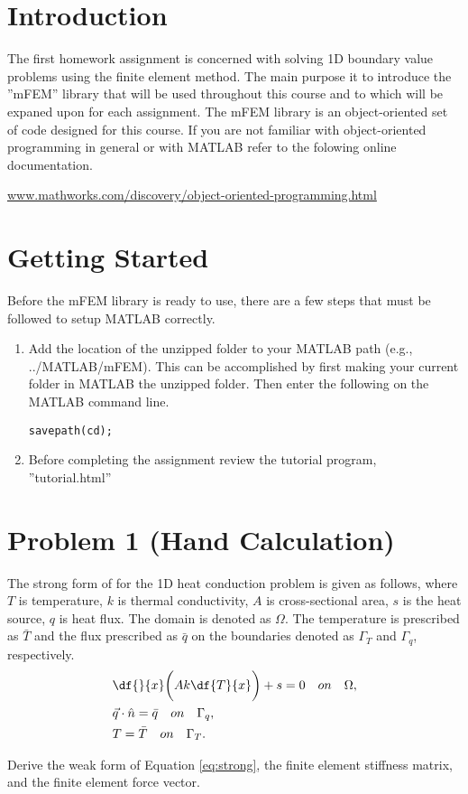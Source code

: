 \section*{Introduction}
The first homework assignment is concerned with solving 1D boundary value problems using the finite element method. The main purpose it to introduce the ''mFEM'' library that will be used throughout this course and to which will be expaned upon for each assignment. The mFEM library is an object-oriented set of code designed for this course. If you are not familiar with object-oriented programming in general or with MATLAB refer to the folowing online documentation. 
\begin{center}
\href{http://www.mathworks.com/discovery/object-oriented-programming.html}{www.mathworks.com/discovery/object-oriented-programming.html}
\end{center}

\section*{Getting Started}
Before the mFEM library is ready to use, there are a few steps that must be followed to setup MATLAB correctly.
\begin{enumerate}
\item Add the location of the unzipped folder to your MATLAB path (e.g., ../MATLAB/mFEM). This can be accomplished by first making your current folder in MATLAB the unzipped folder. Then enter the following on the MATLAB command line.
\begin{lstlisting}
savepath(cd);
\end{lstlisting} 



\item Before completing the assignment review the tutorial program, ''tutorial.html''

\end{enumerate}


\section*{Problem 1 (Hand Calculation)}
The strong form of for the 1D heat conduction problem is given as follows, where $T$ is temperature, $k$ is thermal conductivity, $A$ is cross-sectional area, $s$ is the heat source, $q$ is heat flux. The domain is denoted as $\Omega$. The temperature is prescribed as $\bar{T}$ and the flux prescribed as $\bar{q}$ on the boundaries denoted as $\Gamma_T$ and $\Gamma_q$, respectively.
\begin{equation}\begin{split}\label{eq:strong}
& \df{}{x}\bigg({Ak \df{T}{x}}\bigg) + s = 0 \quad on \quad \Omega, \\
& \vec{q}\cdot \hat{n} = \bar{q} \quad on \quad \Gamma_q, \\
& T = \bar{T} \quad on \quad \Gamma_T.
\end{split}\end{equation}

Derive the weak form of Equation \eqref{eq:strong}, the finite element stiffness matrix, and the finite element force vector.


